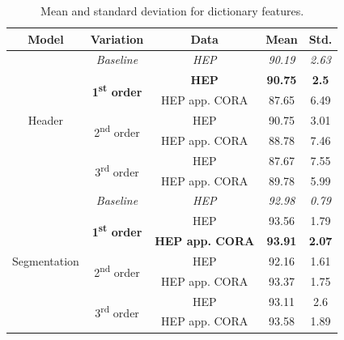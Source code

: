 \begin{table}[h]
\begin{center}
\begin{tabular}{|c|c|c|c|c|}
\hline
Model & Variation & Data & Mean & Std.\\
\hline
\multirow{7}{*}{Header} & \emph{Baseline} & \emph{HEP} & \emph{90.19} & \emph{2.63} \\\cline{3-5}
& \multirow{2}{*}{\textbf{1\textsuperscript{st} order}} & \textbf{HEP} & \textbf{90.75} & \textbf{2.5}\\\cline{3-5}
& & HEP app. CORA & 87.65 & 6.49\\\cline{2-5}
& \multirow{2}{*}{2\textsuperscript{nd} order} & HEP & 90.75 & 3.01\\\cline{3-5}
& & HEP app. CORA & 88.78 & 7.46\\\cline{2-5}
& \multirow{2}{*}{3\textsuperscript{rd} order} & HEP & 87.67 & 7.55\\\cline{3-5}
& & HEP app. CORA & 89.78 & 5.99\\ \hline
\multirow{7}{*}{Segmentation} & \emph{Baseline} & \emph{HEP} & \emph{92.98} & \emph{0.79} \\\cline{2-5}
& \multirow{2}{*}{\textbf{1\textsuperscript{st} order}} & HEP & 93.56 & 1.79\\\cline{3-5}
& & \textbf{HEP app. CORA} & \textbf{93.91} & \textbf{2.07}\\\cline{2-5}
& \multirow{2}{*}{2\textsuperscript{nd} order} & HEP & 92.16 & 1.61\\\cline{3-5}
& & HEP app. CORA & 93.37 & 1.75\\\cline{2-5}
& \multirow{2}{*}{3\textsuperscript{rd} order} & HEP & 93.11 & 2.6\\\cline{3-5}
& & HEP app. CORA & 93.58 & 1.89\\
\hline
\end{tabular}
\caption{Mean and standard deviation for dictionary features.}
\label{table:dictionaryresults}
\end{center}
\end{table}


